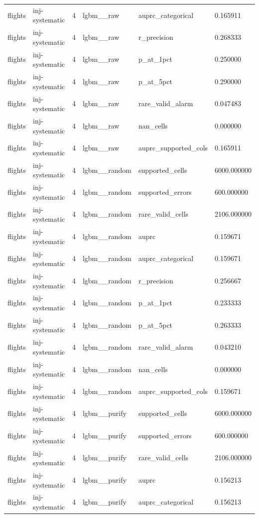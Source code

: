 \begin{tabular}{llllll}
flights & inj-systematic & 4 & lgbm\_\_raw & auprc\_categorical & 0.165911 \\
flights & inj-systematic & 4 & lgbm\_\_raw & r\_precision & 0.268333 \\
flights & inj-systematic & 4 & lgbm\_\_raw & p\_at\_1pct & 0.250000 \\
flights & inj-systematic & 4 & lgbm\_\_raw & p\_at\_5pct & 0.290000 \\
flights & inj-systematic & 4 & lgbm\_\_raw & rare\_valid\_alarm & 0.047483 \\
flights & inj-systematic & 4 & lgbm\_\_raw & nan\_cells & 0.000000 \\
flights & inj-systematic & 4 & lgbm\_\_raw & auprc\_supported\_cols & 0.165911 \\
flights & inj-systematic & 4 & lgbm\_\_random & supported\_cells & 6000.000000 \\
flights & inj-systematic & 4 & lgbm\_\_random & supported\_errors & 600.000000 \\
flights & inj-systematic & 4 & lgbm\_\_random & rare\_valid\_cells & 2106.000000 \\
flights & inj-systematic & 4 & lgbm\_\_random & auprc & 0.159671 \\
flights & inj-systematic & 4 & lgbm\_\_random & auprc\_categorical & 0.159671 \\
flights & inj-systematic & 4 & lgbm\_\_random & r\_precision & 0.256667 \\
flights & inj-systematic & 4 & lgbm\_\_random & p\_at\_1pct & 0.233333 \\
flights & inj-systematic & 4 & lgbm\_\_random & p\_at\_5pct & 0.263333 \\
flights & inj-systematic & 4 & lgbm\_\_random & rare\_valid\_alarm & 0.043210 \\
flights & inj-systematic & 4 & lgbm\_\_random & nan\_cells & 0.000000 \\
flights & inj-systematic & 4 & lgbm\_\_random & auprc\_supported\_cols & 0.159671 \\
flights & inj-systematic & 4 & lgbm\_\_purify & supported\_cells & 6000.000000 \\
flights & inj-systematic & 4 & lgbm\_\_purify & supported\_errors & 600.000000 \\
flights & inj-systematic & 4 & lgbm\_\_purify & rare\_valid\_cells & 2106.000000 \\
flights & inj-systematic & 4 & lgbm\_\_purify & auprc & 0.156213 \\
flights & inj-systematic & 4 & lgbm\_\_purify & auprc\_categorical & 0.156213 \\

\end{tabular}
